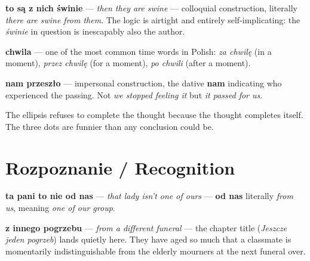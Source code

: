

\textbf{to są z nich świnie} --- \textit{then they are swine} --- colloquial 
construction, literally \textit{there are swine from them}. The logic is 
airtight and entirely self-implicating: the \textit{świnie} in question is 
inescapably also the author.



\textbf{chwila} --- one of the most common time words in Polish: 
\textit{za chwilę} (in a moment), \textit{przez chwilę} (for a moment), 
\textit{po chwili} (after a moment).

\textbf{nam przeszło} --- impersonal construction, the dative \textbf{nam} 
indicating who experienced the passing. Not \textit{we stopped feeling it} 
but \textit{it passed for us}.

The ellipsis refuses to complete the thought because the thought completes 
itself. The three dots are funnier than any conclusion could be.

\section{Rozpoznanie / Recognition}


\textbf{ta pani to nie od nas} --- \textit{that lady isn't one of ours} --- 
\textbf{od nas} literally \textit{from us}, meaning \textit{one of our group}.

\textbf{z innego pogrzebu} --- \textit{from a different funeral} --- the 
chapter title (\textit{Jeszcze jeden pogrzeb}) lands quietly here. They 
have aged so much that a classmate is momentarily indistinguishable from 
the elderly mourners at the next funeral over.

